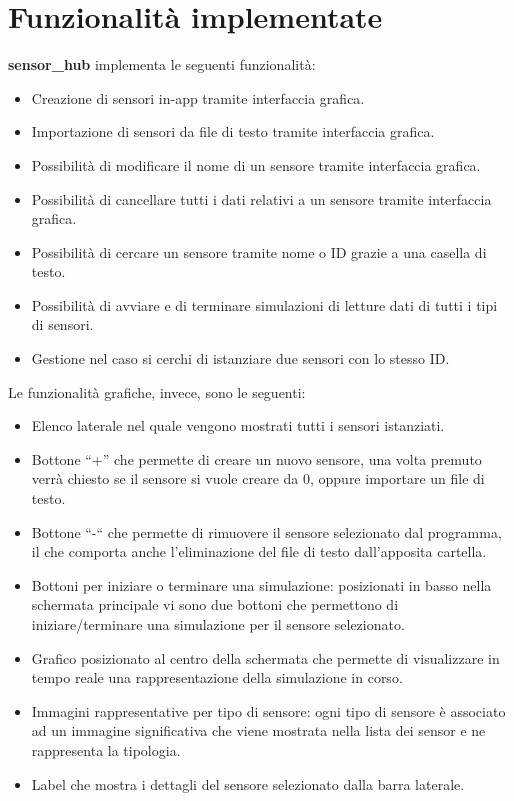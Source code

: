\documentclass{article}
\begin{document}
    \section{Funzionalità implementate}
    \textbf{sensor\_hub} implementa le seguenti funzionalità:
    \begin{itemize}
        \item Creazione di sensori in-app tramite interfaccia grafica.
        \item Importazione di sensori da file di testo tramite interfaccia grafica.
        \item Possibilità di modificare il nome di un sensore tramite interfaccia grafica.
        \item Possibilità di cancellare tutti i dati relativi a un sensore tramite interfaccia grafica.
        \item Possibilità di cercare un sensore tramite nome o ID grazie a una casella di testo.
        \item Possibilità di avviare e di terminare simulazioni di letture dati di tutti i tipi di sensori.
        \item Gestione nel caso si cerchi di istanziare due sensori con lo stesso ID.
    \end{itemize}
    \newpage Le funzionalità grafiche, invece, sono le seguenti:
    \begin{itemize}
        \item Elenco laterale nel quale vengono mostrati tutti i sensori istanziati.
        \item Bottone “+” che permette di creare un nuovo sensore, una volta premuto verrà chiesto se il sensore si vuole creare da 0, oppure importare un file di testo.
        \item Bottone “-“ che permette di rimuovere il sensore selezionato dal programma, il che comporta anche l’eliminazione del file di testo dall’apposita cartella. 
        \item Bottoni per iniziare o terminare una simulazione: posizionati in basso nella schermata principale vi sono due bottoni che permettono di iniziare/terminare una simulazione per il sensore selezionato.
        \item Grafico posizionato al centro della schermata che permette di visualizzare in tempo reale una rappresentazione della simulazione in corso.
        \item Immagini rappresentative per tipo di sensore: ogni tipo di sensore è associato ad un immagine significativa che viene mostrata nella lista dei sensor e ne rappresenta la tipologia.
        \item Label che mostra i dettagli del sensore selezionato dalla barra laterale.
    \end{itemize}
\end{document}
